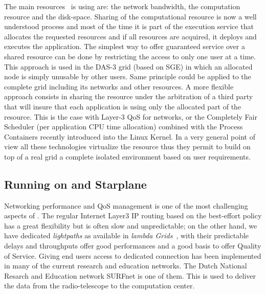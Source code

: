 The main resources \scarie\ is using are: the network bandwidth, the
computation resource and the disk-space. Sharing of the computational
resource is now a well understood process and most of the time it is
part of the execution service that allocates the requested resources
and if all resources are acquired, it deploys and executes the
application.
The simplest way to offer guaranteed service over a shared resource
can be done by restricting the access to only one user at a time. This
approach is used in the DAS-3 grid (based on SGE) in which an
allocated node is simply unusable by other users. Same principle could
be applied to the complete grid including its networks and other
resources. A more flexible approach consists in sharing the resource
under the arbitration of a third party that will insure that each
application is using only the allocated part of the resource. This is
the case with Layer-3 QoS for networks, or the Completely Fair Scheduler 
(per application CPU time allocation) combined with the Process Containers 
recently introduced into the Linux Kernel\cite{cfs}. In
a very general point of view all these technologies virtualize the
resource thus they permit to build on top of a real grid a complete
isolated environment based on user requirements.

\subsection{Running \scarie on  and Starplane}
Networking performance and QoS management is one of the most
challenging aspects of \scarie.  The regular Internet Layer3 IP
routing based on the best-effort policy has a great flexibility but is
often slow and unpredictable; on the other hand, we have dedicated
\textit{lightpaths} as available in \textit{lambda
  Grids}~\cite{eslea-2007}, with their predictable
delays and throughputs offer good performances and a good basis to
offer Quality of Service. Giving end users access to dedicated
connection has been implemented in many of the current research and
education networks. The Dutch National Resarch and Education network
SURFnet is one of them.  This is used to deliver the data from the
radio-telescope to the computation center.

